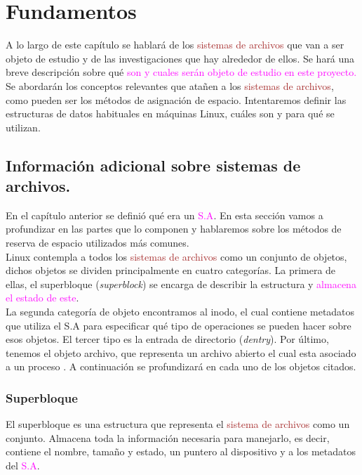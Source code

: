 \cleardoublepage
\clearpage{}

\chapter[Fundamentos]{Fundamentos}
A lo largo de este capítulo se hablará de los \textcolor{brown}{sistemas de archivos} que van a ser objeto de estudio y de las investigaciones que hay alrededor de ellos. Se hará una breve descripción sobre qué \textcolor{magenta}{son y cuales serán objeto de estudio en este proyecto.} \\

Se abordarán los conceptos relevantes que atañen a los \textcolor{brown}{sistemas de archivos}, como pueden ser los métodos de asignación de espacio. Intentaremos definir las estructuras de datos habituales en máquinas Linux, cuáles son y para qué se utilizan. 


\section{Información adicional sobre sistemas de archivos.}
En el capítulo anterior se definió qué era un \textcolor{magenta}{S.A}. En esta sección vamos a profundizar en las partes que lo componen y hablaremos sobre los métodos de reserva de espacio utilizados más comunes.\\

Linux contempla a todos los \textcolor{brown}{sistemas de archivos} como un conjunto de objetos, dichos objetos se dividen principalmente en cuatro categorías. La primera de ellas, el superbloque (\textit{superblock}) se encarga de describir la estructura y \textcolor{magenta}{almacena el estado de este}. \\


 La segunda categoría de objeto encontramos al inodo, el cual contiene metadatos que utiliza el S.A para especificar qué tipo de operaciones se pueden hacer sobre esos objetos. El tercer tipo es la entrada de directorio (\textit{dentry}). Por último, tenemos el objeto archivo, que representa un archivo abierto el cual esta asociado a un proceso \cite{jones_2007}. A continuación se profundizará en cada uno de los objetos citados.\\


\subsection{Superbloque}
El superbloque es una estructura que representa el \textcolor{brown}{sistema de archivos} como un conjunto. Almacena toda la información necesaria para manejarlo, es decir, contiene el nombre, tamaño y estado, un puntero al dispositivo y a los metadatos del \textcolor{magenta}{S.A}.

